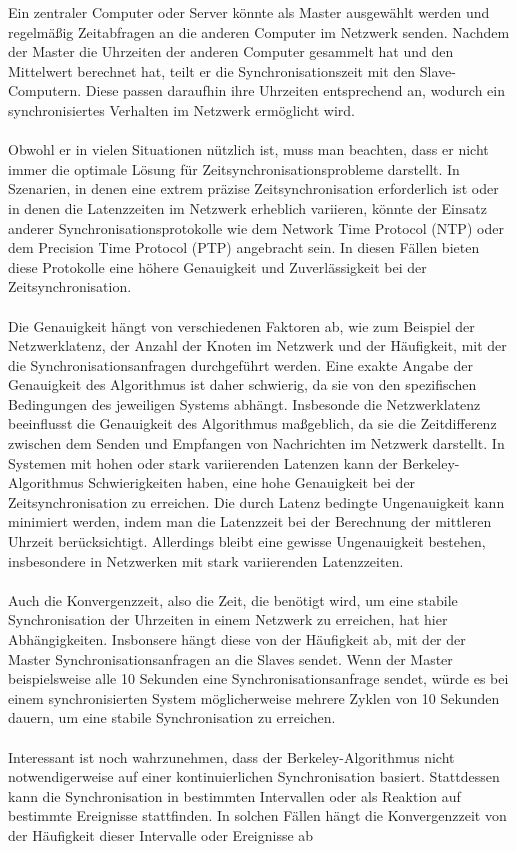 \documentclass[../vs-script-first-v01.tex]{subfiles}
\begin{document}
Ein zentraler Computer oder Server könnte als Master ausgewählt werden und regelmäßig Zeitabfragen an die anderen Computer im Netzwerk senden. Nachdem der Master die Uhrzeiten der anderen Computer gesammelt hat und den Mittelwert berechnet hat, teilt er die Synchronisationszeit mit den Slave-Computern. Diese passen daraufhin ihre Uhrzeiten entsprechend an, wodurch ein synchronisiertes Verhalten im Netzwerk ermöglicht wird.
\\\\
Obwohl er in vielen Situationen nützlich ist, muss man beachten, dass er nicht immer die optimale Lösung für Zeitsynchronisationsprobleme darstellt. In Szenarien, in denen eine extrem präzise Zeitsynchronisation erforderlich ist oder in denen die Latenzzeiten im Netzwerk erheblich variieren, könnte der Einsatz anderer Synchronisationsprotokolle wie dem Network Time Protocol (NTP) oder dem Precision Time Protocol (PTP) angebracht sein. In diesen Fällen bieten diese Protokolle eine höhere Genauigkeit und Zuverlässigkeit bei der Zeitsynchronisation.
\\\\
Die Genauigkeit hängt von verschiedenen Faktoren ab, wie zum Beispiel der Netzwerklatenz, der Anzahl der Knoten im Netzwerk und der Häufigkeit, mit der die Synchronisationsanfragen durchgeführt werden. Eine exakte Angabe der Genauigkeit des Algorithmus ist daher schwierig, da sie von den spezifischen Bedingungen des jeweiligen Systems abhängt. Insbesonde die Netzwerklatenz beeinflusst die Genauigkeit des Algorithmus maßgeblich, da sie die Zeitdifferenz zwischen dem Senden und Empfangen von Nachrichten im Netzwerk darstellt. In Systemen mit hohen oder stark variierenden Latenzen kann der Berkeley-Algorithmus Schwierigkeiten haben, eine hohe Genauigkeit bei der Zeitsynchronisation zu erreichen. Die durch Latenz bedingte Ungenauigkeit kann minimiert werden, indem man die Latenzzeit bei der Berechnung der mittleren Uhrzeit berücksichtigt. Allerdings bleibt eine gewisse Ungenauigkeit bestehen, insbesondere in Netzwerken mit stark variierenden Latenzzeiten.
\\\\
Auch die Konvergenzzeit, also die Zeit, die benötigt wird, um eine stabile Synchronisation der Uhrzeiten in einem Netzwerk zu erreichen, hat hier Abhängigkeiten.  Insbonsere hängt diese von der Häufigkeit ab, mit der der Master Synchronisationsanfragen an die Slaves sendet. Wenn der Master beispielsweise alle 10 Sekunden eine Synchronisationsanfrage sendet, würde es bei einem synchronisierten System möglicherweise mehrere Zyklen von 10 Sekunden dauern, um eine stabile Synchronisation zu erreichen. 
\\\\
Interessant ist noch wahrzunehmen, dass der Berkeley-Algorithmus nicht notwendigerweise auf einer kontinuierlichen Synchronisation basiert. Stattdessen kann die Synchronisation in bestimmten Intervallen oder als Reaktion auf bestimmte Ereignisse stattfinden. In solchen Fällen hängt die Konvergenzzeit von der Häufigkeit dieser Intervalle oder Ereignisse ab
\end{document}
